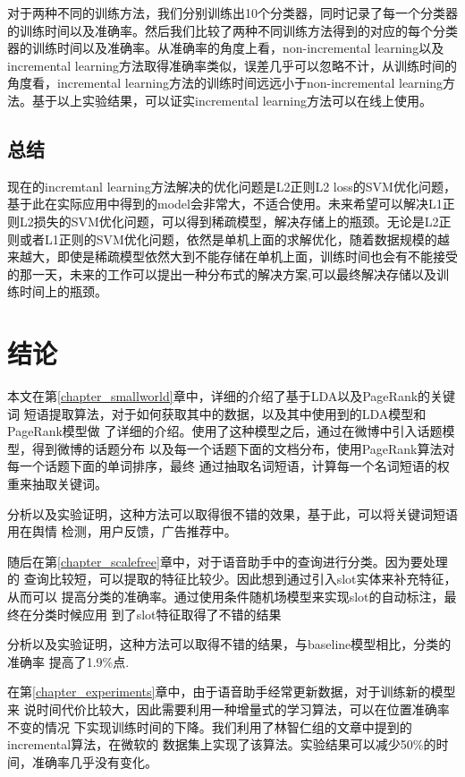 \documentclass[master]{njuthesis}
\begin{document}
    对于两种不同的训练方法，我们分别训练出10个分类器，同时记录了每一个分类器的训练时间以及准确率。然后我们比较了两种不同训练方法得到的对应的每个分类器的训练时间以及准确率。从准确率的角度上看，non-incremental learning以及incremental learning方法取得准确率类似，误差几乎可以忽略不计，从训练时间的角度看，incremental learning方法的训练时间远远小于non-incremental learning方法。基于以上实验结果，可以证实incremental learning方法可以在线上使用。

\section{总结}

    现在的incremtanl learning方法解决的优化问题是L2正则L2 loss的SVM优化问题，基于此在实际应用中得到的model会非常大，不适合使用。未来希望可以解决L1正则L2损失的SVM优化问题，可以得到稀疏模型，解决存储上的瓶颈。无论是L2正则或者L1正则的SVM优化问题，依然是单机上面的求解优化，随着数据规模的越来越大，即使是稀疏模型依然大到不能存储在单机上面，训练时间也会有不能接受的那一天，未来的工作可以提出一种分布式的解决方案,可以最终解决存储以及训练时间上的瓶颈。

\chapter{结论}\label{chapter_concludes}

本文在第\ref{chapter_smallworld}章中，详细的介绍了基于LDA以及PageRank的关键词
短语提取算法，对于如何获取其中的数据，以及其中使用到的LDA模型和PageRank模型做
了详细的介绍。使用了这种模型之后，通过在微博中引入话题模型，得到微博的话题分布
以及每一个话题下面的文档分布，使用PageRank算法对每一个话题下面的单词排序，最终
通过抽取名词短语，计算每一个名词短语的权重来抽取关键词。

分析以及实验证明，这种方法可以取得很不错的效果，基于此，可以将关键词短语用在舆情
检测，用户反馈，广告推荐中。

随后在第\ref{chapter_scalefree}章中，对于语音助手中的查询进行分类。因为要处理的
查询比较短，可以提取的特征比较少。因此想到通过引入slot实体来补充特征，从而可以
提高分类的准确率。通过使用条件随机场模型来实现slot的自动标注，最终在分类时候应用
到了slot特征取得了不错的结果

分析以及实验证明，这种方法可以取得不错的结果，与baseline模型相比，分类的准确率
提高了1.9\%点.


在第\ref{chapter_experiments}章中，由于语音助手经常更新数据，对于训练新的模型来
说时间代价比较大，因此需要利用一种增量式的学习算法，可以在位置准确率不变的情况
下实现训练时间的下降。我们利用了林智仁组的文章中提到的incremental算法，在微软的
数据集上实现了该算法。实验结果可以减少50\%的时间，准确率几乎没有变化。
\end{document}

